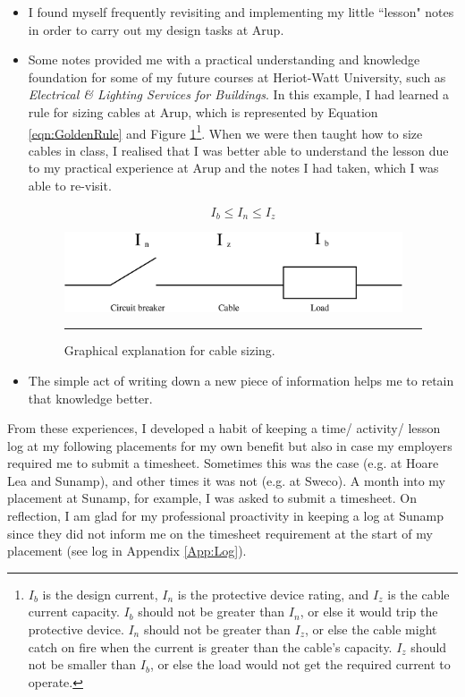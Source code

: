 \begin{itemize}
	\item I found myself frequently revisiting and implementing my little ``lesson" notes in order to carry out my design tasks at Arup.
	\item Some notes provided me with a practical understanding and knowledge foundation for some of my future courses at Heriot-Watt University, such as \textit{Electrical \& Lighting Services for Buildings}.
	In this example, I had learned a rule for sizing cables at Arup, which is represented by Equation \ref{eqn:GoldenRule} and Figure \ref{fig:GoldenRule}\footnote{
		$I_b$ is the design current, $I_n$ is the protective device rating, and $I_z$ is the cable current capacity.
		$I_b$ should not be greater than $I_n$, or else it would trip the protective device.
		$I_n$ should not be greater than $I_z$, or else the cable might catch on fire when the current is greater than the cable's capacity.
		$I_z$ should not be smaller than $I_b$, or else the load would not get the required current to operate.
		}.
	When we were then taught how to size cables in class, I realised that I was better able to understand the lesson due to my practical experience at Arup and the notes I had taken, which I was able to re-visit.
	
	\begin{equation}
	I_b \leq I_n \leq I_z
	\label{eqn:GoldenRule}
	\end{equation}
	
	\begin{figure}[H]
		\centering
		\includegraphics[width=10cm]{figures/GoldenRule.eps}
		\rule{10cm}{0.5pt} %
		\caption{Graphical explanation for cable sizing.}
		\label{fig:GoldenRule}
	\end{figure}
	
	\item The simple act of writing down a new piece of information helps me to retain that knowledge better.
\end{itemize}

From these experiences, I developed a habit of keeping a time/ activity/ lesson log at my following placements for my own benefit but also in case my employers required me to submit a timesheet.
Sometimes this was the case (e.g. at Hoare Lea and Sunamp), and other times it was not (e.g. at Sweco).
A month into my placement at Sunamp, for example, I was asked to submit a timesheet.
On reflection, I am glad for my professional proactivity in keeping a log at Sunamp since they did not inform me on the timesheet requirement at the start of my placement (see log in Appendix \ref{App:Log}).



